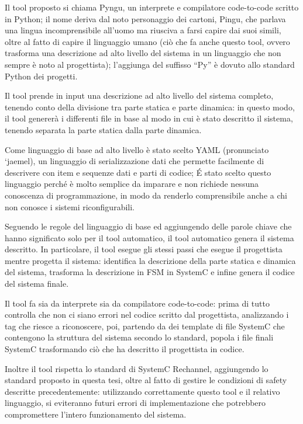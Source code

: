 \documentclass[a4paper,titlepage]{book}
\begin{document}
Il tool proposto si chiama Pyngu, un interprete e compilatore code-to-code scritto in Python; il nome deriva dal noto personaggio dei cartoni, Pingu, che parlava una lingua incomprensibile all'uomo ma riusciva a farsi capire dai suoi simili, oltre al fatto di capire il linguaggio umano (ciò che fa anche questo tool, ovvero trasforma una descrizione ad alto livello del sistema in un linguaggio che non sempre è noto al progettista); l'aggiunga del suffisso ``Py'' è dovuto allo standard Python dei progetti.

Il tool prende in input una descrizione ad alto livello del sistema completo, tenendo conto della divisione tra parte statica e parte dinamica: in questo modo, il tool genererà i differenti file in base al modo in cui è stato descritto il sistema, tenendo separata la parte statica dalla parte dinamica.

Come linguaggio di base ad alto livello è stato scelto YAML (pronunciato `jaemel), un linguaggio di serializzazione dati che permette facilmente di descrivere con item e sequenze dati e parti di codice; \'{E} stato scelto questo linguaggio perché è molto semplice da imparare e non richiede nessuna conoscenza di programmazione, in modo da renderlo comprensibile anche a chi non conosce i sistemi riconfigurabili.

Seguendo le regole del linguaggio di base ed aggiungendo delle parole chiave che hanno significato solo per il tool automatico, il tool automatico genera il sistema descritto. In particolare, il tool esegue gli stessi passi che esegue il progettista mentre progetta il sistema: identifica la descrizione della parte statica e dinamica del sistema, trasforma la descrizione in FSM in SystemC e infine genera il codice del sistema finale.

Il tool fa sia da interprete sia da compilatore code-to-code: prima di tutto controlla che non ci siano errori nel codice scritto dal progettista, analizzando i tag che riesce a riconoscere, poi, partendo da dei template di file SystemC che contengono la struttura del sistema secondo lo standard, popola i file finali SystemC trasformando ciò che ha descritto il progettista in codice.

Inoltre il tool rispetta lo standard di SystemC Rechannel, aggiungendo lo standard proposto in questa tesi, oltre al fatto di gestire le condizioni di safety descritte precedentemente: utilizzando correttamente questo tool e il relativo linguaggio, si eviteranno futuri errori di implementazione che potrebbero compromettere l'intero funzionamento del sistema.
\end{document}
